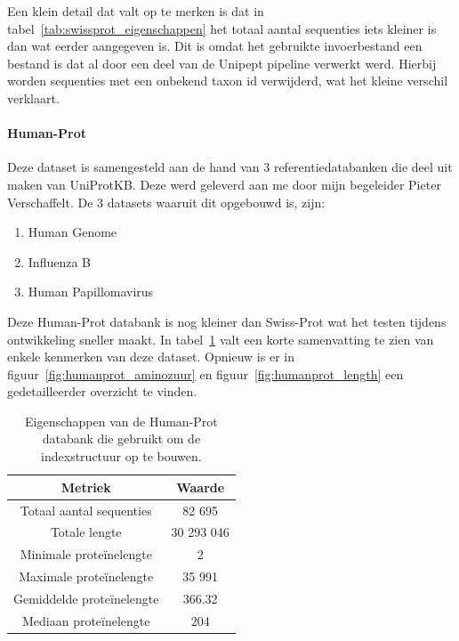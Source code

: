 \documentclass[11pt,dutch,faculty=we,layout=titlefont,underline=false,titleUppercase=true,titleUnderline=true]{ugent2016-report}
\begin{document}
    Een klein detail dat valt op te merken is dat in tabel~\ref{tab:swissprot_eigenschappen} het totaal aantal sequenties iets kleiner is dan wat eerder aangegeven is.
    Dit is omdat het gebruikte invoerbestand een bestand is dat al door een deel van de Unipept pipeline verwerkt werd.
    Hierbij worden sequenties met een onbekend taxon id verwijderd, wat het kleine verschil verklaart.

    \paragraph{Human-Prot} Deze dataset is samengesteld aan de hand van 3 referentiedatabanken die deel uit maken van UniProtKB\@.
    Deze werd geleverd aan me door mijn begeleider Pieter Verschaffelt.
    De 3 datasets waaruit dit opgebouwd is, zijn:
    \begin{enumerate}
        \item Human Genome~\cite{proteomes_homo_sapiens}
        \item Influenza B~\cite{proteomes_infuenza_b}
        \item Human Papillomavirus~\cite{proteomes_human_papillomavirus}
    \end{enumerate}

    Deze Human-Prot databank is nog kleiner dan Swiss-Prot wat het testen tijdens ontwikkeling sneller maakt.
    In tabel~\ref{tab:humanprot_eigenschappen} valt een korte samenvatting te zien van enkele kenmerken van deze dataset.
    Opnieuw is er in figuur~\ref{fig:humanprot_aminozuur} en figuur~\ref{fig:humanprot_length} een gedetailleerder overzicht te vinden.

    \begin{table}[h!]
        \centering
        \begin{tabular}{ c c }
            Metriek                   & Waarde     \\
            \hline\hline
            Totaal aantal sequenties  & 82 695     \\
            Totale lengte             & 30 293 046 \\
            Minimale proteïnelengte   & 2          \\
            Maximale proteïnelengte   & 35 991     \\
            Gemiddelde proteïnelengte & 366.32     \\
            Mediaan proteïnelengte    & 204        \\
            \hline
        \end{tabular}
        \caption{Eigenschappen van de Human-Prot databank die gebruikt om de indexstructuur op te bouwen.}
        \label{tab:humanprot_eigenschappen}
    \end{table}
\end{document}
